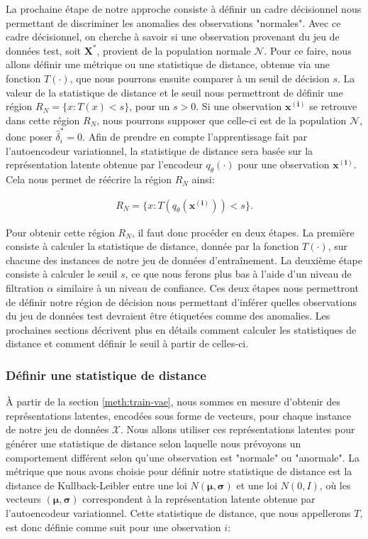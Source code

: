 La prochaine étape de notre approche consiste à définir un cadre décisionnel nous permettant de discriminer les anomalies des observations "normales". Avec ce cadre décisionnel, on cherche à savoir si une observation provenant du jeu de données test, soit $\boldsymbol{X}^{*}$, provient de la population normale $\mathcal{N}$. Pour ce faire, nous allons définir une métrique ou une statistique de distance, obtenue via une fonction $T(\cdot)$, que nous pourrons ensuite comparer à un seuil de décision $s$. La valeur de la statistique de distance et le seuil nous permettront de définir une région $R_{N}=\{x :T(x)<s\}$\DIFdelbegin {}\DIFdelend , pour un $s>0$. Si une observation $\boldsymbol{x^{(i)}}$ se retrouve dans cette région $R_{N}$, nous pourrons supposer que celle-ci est de la population $\mathcal{N}$, donc poser $\hat{\delta}^{*}_{i}=0$. Afin de prendre en compte l'apprentissage fait par l'autoencodeur variationnel, la statistique de distance sera basée sur la représentation latente obtenue par l'encodeur $q_\theta(\cdot)$ pour une observation $\boldsymbol{x^{(i)}}$. Cela nous permet de réécrire la région $R_N$ ainsi:

\begin{gather*}  \label{eq:region}
R_{N}=\{x :T(q_\theta(\boldsymbol{x^{(i)}}))<s\}.
\end{gather*}

Pour obtenir cette région $R_N$, il faut donc procéder en deux étapes. La première consiste à calculer la statistique de distance, donnée par la fonction $T(\cdot)$, sur chacune des instances de notre jeu de données d'entraînement. La deuxième étape consiste à calculer le seuil $s$, ce que nous ferons plus bas à l'aide d'un niveau de filtration $\alpha$ similaire à un niveau de confiance. Ces deux étapes nous permettront de définir notre région de décision nous permettant d'inférer quelles observations du jeu de données test devraient être étiquetées comme des anomalies. Les prochaines sections décrivent plus en détails comment calculer les statistiques de distance et comment définir le seuil à partir de celles-ci.

\subsubsection{Définir une statistique de distance}

 À partir de la section \ref{meth:train-vae}, nous sommes en mesure d'obtenir des représentations latentes, encodées sous forme de vecteurs, pour chaque instance de notre jeu de données $\mathcal{X}$. Nous allons utiliser ces représentations latentes pour générer une statistique de distance selon laquelle nous prévoyons un comportement différent selon qu'une observation est "normale" ou "anormale". La métrique que nous avons choisie pour définir notre statistique de distance est la distance de Kullback-Leibler entre une loi $N(\boldsymbol{\mu}, \boldsymbol{\sigma})$ et une loi $N(0,I)$, où les vecteurs $(\boldsymbol{\mu}, \boldsymbol{\sigma})$ correspondent à la représentation latente obtenue par l'autoencodeur variationnel. Cette statistique de distance, que nous appellerons $T$, est donc définie comme suit pour une observation $i$:

